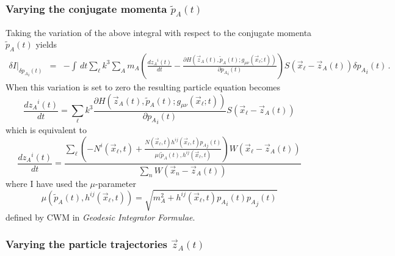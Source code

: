 \subsubsection{Varying the conjugate momenta $\tilde p_A(t)$}
Taking the variation of the above integral with respect to 
the conjugate momenta $\tilde p_A(t)$ yields
\begin{eqnarray*}
  \delta I \vert_{\delta {p_A}_i(t)} & = & - \int \, dt \sum _{\ell} k^3 \sum _{A} m_A
                                        \left(
										  \frac{ d {z_A}^i(t) }{d t}
										 -\frac{ \partial H(\vec z_A(t),
										                    \tilde p_A(t);
                                                            g_{\mu\nu}(\vec x_{\ell};t)) }
											   { \partial {p_A}_i(t)}
										\right)											   
										   S({\vec x}_{\ell} - {\vec z}_A(t))			
                                           \delta {p_A}_i(t) \, . 
\end{eqnarray*}
When this variation is set to zero the resulting particle equation becomes 
\[
   \frac{ d {z_A}^i(t) }{d t} = \sum _{\ell} k^3 
                                  \frac{ \partial H(\vec z_A(t),
										            \tilde p_A(t);
                                                    g_{\mu\nu}(\vec x_{\ell};t)) 
									   }
									   { \partial {p_A}_i(t)}
  									   S({\vec x}_{\ell} - {\vec z}_A(t))													  
\]
which is equivalent to 
\[
   \frac{ d {z_A}^i(t) }{d t} = \frac{
                                          \sum _{\ell}
										  \left( 
										  -N^i(\vec x_{\ell},t) 
										  +
										  \frac{
										        N(\vec x_{\ell},t) 
												h^{ij}(\vec x_{\ell},t)
												{p_A}_j(t)
										       }
											   {\mu(\tilde p_A(t),
											        h^{ij}(\vec x_{\ell},t)
											   } 
										  \right)                                    
										  W(\vec x_{\ell} - \vec z_A(t))									 
									 }
									 {
    									 \sum _{n} W(\vec x_{n} - \vec z_A(t))
									 }
\]
where I have used the $\mu$-parameter 
\[
  \mu(\tilde p_A(t),h^{ij}(\vec x_{\ell},t)) = \sqrt{
			            					             m_A^2 
													   + h^{ij}(\vec x_{\ell},t) 
            						            		{p_A}_i(t) 
            						            		{p_A}_j(t)
													   }
\]
defined by CWM in \emph{Geodesic Integrator Formulae}.

\subsubsection{Varying the particle trajectories $\vec z_A(t)$}


